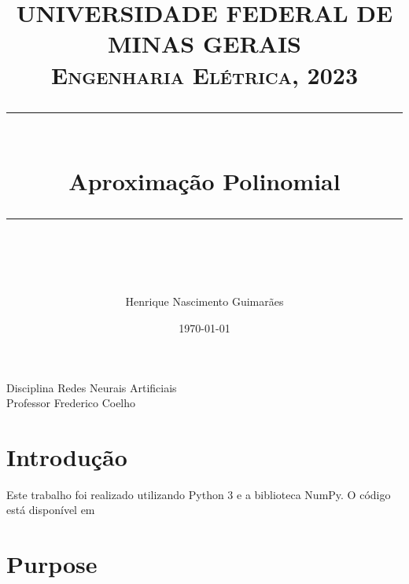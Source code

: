 \documentclass{article}
\title{
\normalfont \normalsize 
\textsc{UNIVERSIDADE FEDERAL DE MINAS GERAIS \\ 
Engenharia Elétrica, 2023} \\
[10pt] 
\rule{\linewidth}{0.5pt} \\[6pt] 
\huge Aproximação Polinomial \\
\rule{\linewidth}{2pt}  \\[10pt]
}
\author{Henrique Nascimento Guimarães}
\date{\normalsize \today}
\begin{document}
\maketitle
\noindent
Disciplina \dotfill Redes Neurais Artificiais \\
Professor \dotfill Frederico Coelho \\

\section{Introdução}

  Este trabalho foi realizado utilizando Python 3 e a biblioteca NumPy. O código está disponível em 

\section{Purpose}
\end{document}
